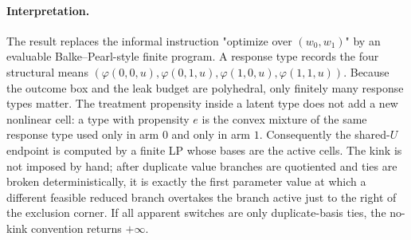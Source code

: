 \paragraph{Interpretation.}
The result replaces the informal instruction "optimize over $(w_0,w_1)$" by an evaluable Balke--Pearl-style
finite program. A response type records the four structural means
\((\varphi(0,0,u),\varphi(0,1,u),\varphi(1,0,u),\varphi(1,1,u))\). Because the outcome box and the leak budget
are polyhedral, only finitely many response types matter. The treatment propensity inside a latent type does
not add a new nonlinear cell: a type with propensity \(e\) is the convex mixture of the same response type used
only in arm \(0\) and only in arm \(1\). Consequently the shared-\(U\) endpoint is computed by a finite LP whose
bases are the active cells. The kink is not imposed by hand; after duplicate value branches are quotiented and
ties are broken deterministically, it is exactly the first parameter value at which a different feasible reduced
branch overtakes the branch active just to the right of the exclusion corner. If all apparent switches are only
duplicate-basis ties, the no-kink convention returns \(+\infty\).

